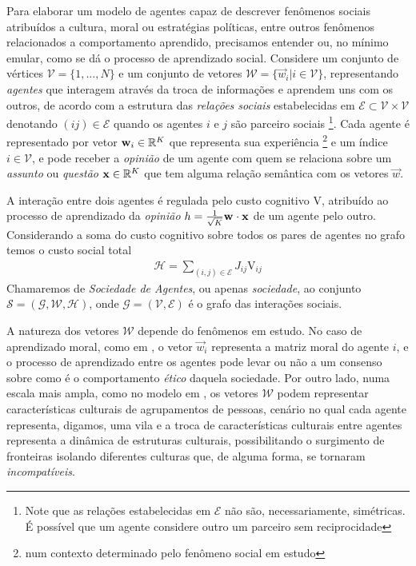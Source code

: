 \newcommand{\agt}[1]{\ensuremath{\vec{w}_{#1}}}
\newcommand{\vrt}{\ensuremath{\mathcal{V}}}
\newcommand{\edg}{\ensuremath{\mathcal{E}}}
\newcommand{\MM}{\ensuremath{\mathcal{W}}}
Para elaborar um modelo de agentes capaz de descrever fenômenos sociais atribuídos a cultura, moral ou estratégias políticas, entre outros fenômenos relacionados a comportamento aprendido, precisamos entender ou, no mínimo emular, como se dá o processo de aprendizado social.
Considere um conjunto de vértices $\vrt = \{1,\dots,N\}$ e um conjunto de vetores $\MM = \{\agt{i} | i \in \vrt \}$, representando \emph{agentes} que interagem através da troca de informações e aprendem uns com os outros, de acordo com a estrutura das \emph{relações sociais} estabelecidas em $\edg \subset \vrt \times \vrt$ denotando $(ij)\in\edg$ quando os agentes $i$ e $j$ são parceiro sociais \footnote{Note que as relações estabelecidas em $\edg$ não são, necessariamente, simétricas.
É possível que um agente considere outro um parceiro sem   reciprocidade}.
Cada agente é representado por vetor $\agt{i} \in \R^K$ que representa sua experiência \footnote{num contexto determinado pelo fenômeno social em estudo} e um índice $i \in \vrt$, e pode receber a \emph{opinião} de um agente com quem se relaciona sobre um \emph{assunto} ou \emph{questão} $\mathbf{x} \in \mathbb{R}^K$ que tem alguma relação semântica com os vetores $\vec{w}$.

\newcommand{\cogcost}{\ensuremath{{\mathrm{V}}}}
\newcommand{\opn}[3][1]{\ensuremath{
      {#1\over \sqrt{K}} \agt{#2} \cdot \vec{#3}}}
\newcommand{\cost}{\ensuremath{{\mathcal{H}}}}
\newcommand{\SG}{\ensuremath{\mathcal{G}}}
\newcommand{\soc}{\ensuremath{\mathcal{S}}}
A interação entre dois agentes é regulada pelo custo cognitivo $\cogcost$, atribuído ao processo de aprendizado da \emph{opinião} $h = \opn{ }{x}$ de um agente pelo outro.
Considerando a soma do custo cognitivo sobre todos os pares de agentes no grafo temos o custo social total
\begin{align}
  \cost = \sum_{(i,j)\in \edg} J_{ij} \cogcost_{ij} \label{eq:Scost}
\end{align}
Chamaremos de \emph{Sociedade de Agentes}, ou apenas \emph{sociedade}, ao conjunto $\soc = (\SG, \MM, \cost)$, onde $\SG = (\vrt,\edg)$ é o grafo das interações sociais.

A natureza dos vetores $\MM$ depende do fenômenos em estudo.
No caso de aprendizado moral, como em \parencite{Cesar2014, Vicente2014}, o vetor $\agt{i}$ representa a matriz moral do agente $i$, e o processo de aprendizado entre os agentes pode levar ou não a um consenso sobre como é o comportamento \emph{ético} daquela sociedade.
Por outro lado, numa escala mais ampla, como no modelo em \parencite{Axelrod1997}, os vetores $\MM$ podem representar características culturais de agrupamentos de pessoas, cenário no qual cada agente representa, digamos, uma vila e a troca de características culturais entre agentes representa a dinâmica de estruturas culturais, possibilitando o surgimento de fronteiras isolando diferentes culturas que, de alguma forma, se tornaram \emph{incompatíveis}.

